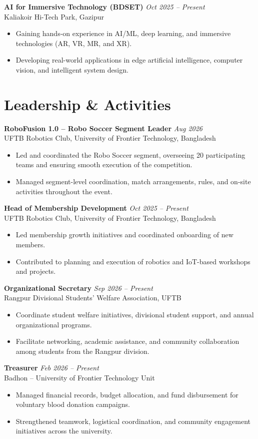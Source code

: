\documentclass[11pt,a4paper]{article}
\begin{document}
\textbf{AI for Immersive Technology (BDSET)} \hfill \textit{Oct 2025 -- Present} \\
Kaliakoir Hi-Tech Park, Gazipur
\begin{itemize}
    \item Gaining hands-on experience in AI/ML, deep learning, and immersive technologies (AR, VR, MR, and XR).
    \item Developing real-world applications in edge artificial intelligence, computer vision, and intelligent system design.
\end{itemize}

\section*{Leadership \& Activities}

\textbf{RoboFusion 1.0 -- Robo Soccer Segment Leader} \hfill \textit{Aug 2026} \\
UFTB Robotics Club, University of Frontier Technology, Bangladesh
\begin{itemize}
    \item Led and coordinated the Robo Soccer segment, overseeing 20 participating teams and ensuring smooth execution of the competition.
    \item Managed segment-level coordination, match arrangements, rules, and on-site activities throughout the event.
\end{itemize}
\textbf{Head of Membership Development} \hfill \textit{Oct 2025 -- Present} \\
UFTB Robotics Club, University of Frontier Technology, Bangladesh
\begin{itemize}
    \item Led membership growth initiatives and coordinated onboarding of new members.
    \item Contributed to planning and execution of robotics and IoT-based workshops and projects.
\end{itemize}
\textbf{Organizational Secretary} \hfill \textit{Sep 2026 -- Present} \\
Rangpur Divisional Students' Welfare Association, UFTB
\begin{itemize}
    \item Coordinate student welfare initiatives, divisional student support, and annual organizational programs.
    \item Facilitate networking, academic assistance, and community collaboration among students from the Rangpur division.
\end{itemize}
\textbf{Treasurer} \hfill \textit{Feb 2026 -- Present} \\
Badhon -- University of Frontier Technology Unit
\begin{itemize}
    \item Managed financial records, budget allocation, and fund disbursement for voluntary blood donation campaigns.
    \item Strengthened teamwork, logistical coordination, and community engagement initiatives across the university.
\end{itemize}
\end{document}
